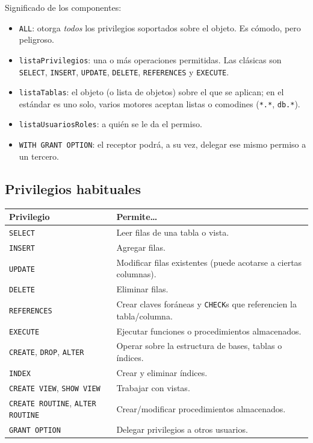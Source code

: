 \documentclass[11pt,a4paper]{article}
\begin{document}
Significado de los componentes:

\begin{itemize}
    \item \texttt{ALL}: otorga \emph{todos} los privilegios soportados
    sobre el objeto. Es cómodo, pero peligroso.
    \item \texttt{listaPrivilegios}: una o más operaciones permitidas.
    Las clásicas son \texttt{SELECT}, \texttt{INSERT}, \texttt{UPDATE},
    \texttt{DELETE}, \texttt{REFERENCES} y \texttt{EXECUTE}.
    \item \texttt{listaTablas}: el objeto (o lista de objetos) sobre el
    que se aplican; en el estándar es uno solo, varios motores aceptan
    listas o comodines (\texttt{*.*}, \texttt{db.*}).
    \item \texttt{listaUsuariosRoles}: a quién se le da el permiso.
    \item \texttt{WITH GRANT OPTION}: el receptor podrá, a su vez,
    delegar ese mismo permiso a un tercero.
\end{itemize}

\subsection{Privilegios habituales}

\begin{center}
\begin{tabular}{@{}l p{9.5cm}@{}}
\toprule
\textbf{Privilegio} & \textbf{Permite\dots} \\
\midrule
\texttt{SELECT}       & Leer filas de una tabla o vista. \\
\texttt{INSERT}       & Agregar filas. \\
\texttt{UPDATE}       & Modificar filas existentes (puede acotarse a
                        ciertas columnas). \\
\texttt{DELETE}       & Eliminar filas. \\
\texttt{REFERENCES}   & Crear claves foráneas y \texttt{CHECK}s que
                        referencien la tabla/columna. \\
\texttt{EXECUTE}      & Ejecutar funciones o procedimientos almacenados. \\
\texttt{CREATE}, \texttt{DROP}, \texttt{ALTER} & Operar sobre la
                        estructura de bases, tablas o índices. \\
\texttt{INDEX}        & Crear y eliminar índices. \\
\texttt{CREATE VIEW}, \texttt{SHOW VIEW} & Trabajar con vistas. \\
\texttt{CREATE ROUTINE}, \texttt{ALTER ROUTINE} & Crear/modificar
                        procedimientos almacenados. \\
\texttt{GRANT OPTION} & Delegar privilegios a otros usuarios. \\
\bottomrule
\end{tabular}
\end{center}
\end{document}
